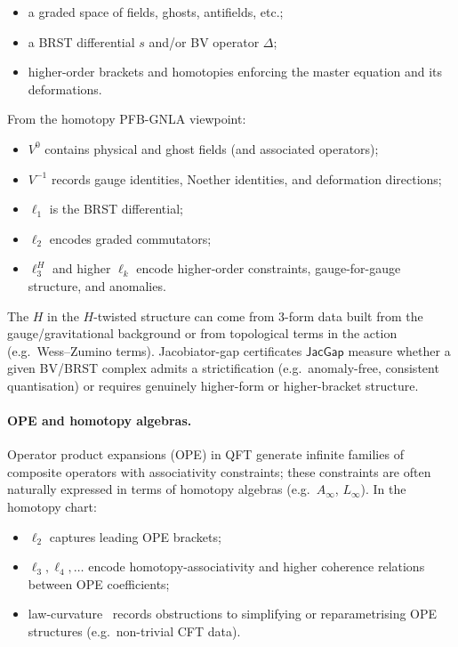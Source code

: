 \documentclass[11pt]{book}
\theoremstyle{plain}
\theoremstyle{definition}
\begin{document}
\begin{itemize}
  \item a graded space of fields, ghosts, antifields, etc.;
  \item a BRST differential $s$ and/or BV operator $\Delta$;
  \item higher-order brackets and homotopies enforcing the master
        equation and its deformations.
\end{itemize}

From the homotopy PFB-GNLA viewpoint:

\begin{itemize}
  \item $V^0$ contains physical and ghost fields (and associated
        operators);
  \item $V^{-1}$ records gauge identities, Noether identities, and
        deformation directions;
  \item $\ell_1$ is the BRST differential;
  \item $\ell_2$ encodes graded commutators;
  \item $\ell_3^H$ and higher $\ell_k$ encode higher-order constraints,
        gauge-for-gauge structure, and anomalies.
\end{itemize}

The $H$ in the $H$-twisted structure can come from 3-form data built from the \\
gauge/gravitational background or from topological terms in
the action (e.g.\ Wess--Zumino terms). Jacobiator-gap certificates
$\mathsf{JacGap}$ measure whether a given BV/BRST complex admits a
strictification (e.g.\ anomaly-free, consistent quantisation) or
requires genuinely higher-form or higher-bracket structure.

\paragraph{OPE and homotopy algebras.}

Operator product expansions (OPE) in QFT generate infinite families of
composite operators with associativity constraints; these constraints
are often naturally expressed in terms of homotopy algebras (e.g.\
$A_\infty$, $L_\infty$). In the homotopy chart:

\begin{itemize}
  \item $\ell_2$ captures leading OPE brackets;
  \item $\ell_3,\ell_4,\dots$ encode homotopy-associativity and higher
        coherence relations between OPE coefficients;
  \item law-curvature \GZLCurv\ records obstructions to simplifying or
        reparametrising OPE structures (e.g.\ non-trivial CFT data).
\end{itemize}
\end{document}
